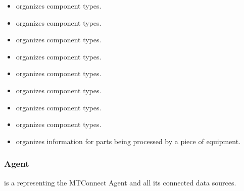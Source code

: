 \begin{itemize}

\item {} \newline {} \glspl{organize}  component types. 

\item {} \newline {} \glspl{organize}  component types. 

\item {} \newline {} \glspl{organize}  component types. 

\item {} \newline {} \glspl{organize}  component types. 

\item {} \newline {} \glspl{organize}  component types. 

\item {} \newline {} \glspl{organize}  component types. 

\item {} \newline {} \glspl{organize}  component types. 

\item {} \newline {} \glspl{organize}  component types. 

\item {} \newline {} \glspl{organize} information for \glspl{part} being processed by a piece of equipment.
\end{itemize}



\subsubsection{Agent}
\label{sec:Agent}



 is a  representing the \gls{MTConnect Agent} and all its connected data sources.

